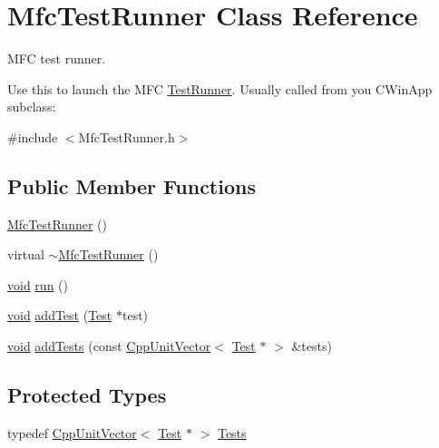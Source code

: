 \hypertarget{class_mfc_test_runner}{\section{Mfc\-Test\-Runner Class Reference}
\label{class_mfc_test_runner}
}


M\-F\-C test runner.

Use this to launch the M\-F\-C \hyperlink{class_test_runner}{Test\-Runner}. Usually called from you C\-Win\-App subclass\-:  




{\ttfamily \#include $<$Mfc\-Test\-Runner.\-h$>$}

\subsection*{Public Member Functions}
\begin{DoxyCompactItemize}
\item 
\hyperlink{class_mfc_test_runner_a604ac682ac85e92ee2753f724e6c8f41}{Mfc\-Test\-Runner} ()
\item 
virtual \hyperlink{class_mfc_test_runner_ae6411992b85b9b761efe6d5a9f1dbbeb}{$\sim$\-Mfc\-Test\-Runner} ()
\item 
\hyperlink{wglew_8h_aeea6e3dfae3acf232096f57d2d57f084}{void} \hyperlink{class_mfc_test_runner_aea503f886c3a992b557d4dfc223bb0b2}{run} ()
\item 
\hyperlink{wglew_8h_aeea6e3dfae3acf232096f57d2d57f084}{void} \hyperlink{class_mfc_test_runner_aedb029517afb5863e483bf9ff0d7d1ed}{add\-Test} (\hyperlink{class_test}{Test} $\ast$test)
\item 
\hyperlink{wglew_8h_aeea6e3dfae3acf232096f57d2d57f084}{void} \hyperlink{class_mfc_test_runner_a99c469dd7f65c820a378e217ca886fd9}{add\-Tests} (const \hyperlink{_cpp_unit_vector_8h_ab1af16468212807e5cc231dc1ef32323}{Cpp\-Unit\-Vector}$<$ \hyperlink{class_test}{Test} $\ast$ $>$ \&tests)
\end{DoxyCompactItemize}
\subsection*{Protected Types}
\begin{DoxyCompactItemize}
\item 
typedef \hyperlink{_cpp_unit_vector_8h_ab1af16468212807e5cc231dc1ef32323}{Cpp\-Unit\-Vector}$<$ \hyperlink{class_test}{Test} $\ast$ $>$ \hyperlink{class_mfc_test_runner_a6911063cb903f782927897e33df1692f}{Tests}
\end{DoxyCompactItemize}
